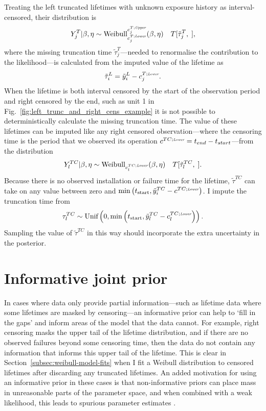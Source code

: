 Treating the left truncated lifetimes with unknown exposure history as interval-censored, their distribution is
\begin{equation}
    Y^T_j|\beta, \eta \sim \hbox{Weibull}^{c^{T;\textit{\tiny{Upper}}}_{j}}_{c^{T;\textit{\tiny{Lower}}}_{j}}(\beta, \eta) \quad T[\tilde{\tau}^{T}_j, \;],
\end{equation}
where the missing truncation time $\tilde{\tau}^{T}_j$---needed to renormalise the contribution to the likelihood---is calculated from the imputed value of the lifetime as
\begin{equation}
   \tilde{\tau}^L_i = \tilde{y}^L_i - c^{T;\textit{\tiny{Lower}}}_{j}.
\end{equation}
When the lifetime is both interval censored by the start of the observation period and right censored by the end, such as unit 1 in Fig.~\ref{fig:left_trunc_and_right_cens_example} it is not possible to deterministically calculate the missing truncation time. The value of these lifetimes can be imputed like any right censored observation---where the censoring time is the period that we observed its operation $c^{TC;\textit{\tiny{Lower}}} = t_{end} - t_{start}$---from the distribution
\begin{equation}
    Y^{TC}_l|\beta, \eta \sim \hbox{Weibull}_{c^{TC;\textit{\tiny{Lower}}}_{l}}(\beta, \eta) \quad T[\tilde{\tau}^{TC}_l, \;]. 
\end{equation}
Because there is no observed installation or failure time for the lifetime, $\tilde{\tau}^{TC}$ can take on any value between zero and $\min\left(t_\text{start}, \tilde{y}^{TC}_i - c^{TC;\textit{\tiny{Lower}}}\right)$. I impute the truncation time from
\begin{equation}
    \label{eq:imp-trun-times}
    \tau^{TC}_l \sim \hbox{Unif}\left(0, \min\left(t_\text{start}, \tilde{y}^{TC}_l - c^{TC;\textit{\tiny{Lower}}}_l\right)\right).
\end{equation}
Sampling the value of $\tilde{\tau}^{TC}$ in this way should incorporate the extra uncertainty in the posterior.

\section{Informative joint prior} \label{sec:weibull-joint-prior}

In cases where data only provide partial information---such as lifetime data where some lifetimes are masked by censoring---an informative prior can help to `fill in the gaps' and inform areas of the model that the data cannot. For example, right censoring masks the upper tail of the lifetime distribution, and if there are no observed failures beyond some censoring time, then the data do not contain any information that informs this upper tail of the lifetime. This is clear in Section~\ref{subsec:weibull-model-fits} when I fit a Weibull distribution to censored lifetimes after discarding any truncated lifetimes. An added motivation for using an informative prior in these cases is that non-informative priors can place mass in unreasonable parts of the parameter space, and when combined with a weak likelihood, this leads to spurious parameter estimates \citep{tian2024}.

